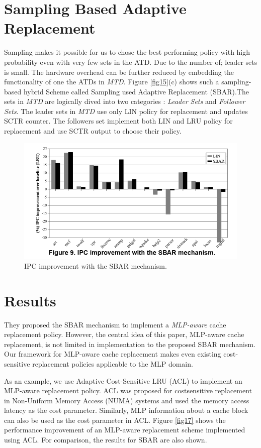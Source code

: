 \documentclass{report}
\begin{document}
\section{Sampling Based Adaptive Replacement}

Sampling makes it possible for us to chose the best performing policy with high probability even with very few sets in the ATD. Due to the number of; leader sets is small. The hardware overhead can be further reduced by embedding the functionality of one the ATDs in \emph{MTD}. Figure \ref{fig15}(c) shows such a sampling-based hybrid Scheme called Sampling used Adaptive Replacement (SBAR).The sets in \emph{MTD} are logically dived into two categories : \emph{Leader Sets} and \emph{Follower Sets}. The leader sets in \emph{MTD} use only LIN policy for replacement and updates SCTR counter. The followers set implement both LIN and LRU policy for replacement and use SCTR output to choose their policy.

\begin{figure}[h!]
\includegraphics[width=1\textwidth]{./fig16}
\caption{ IPC improvement with the SBAR mechanism.}
\label{fig16}
\end{figure}

\section{Results}
They proposed the SBAR mechanism to implement a \emph{MLP-aware} cache replacement policy. However, the central idea of this paper, MLP-aware cache replacement, is not limited in implementation to the proposed SBAR mechanism. Our framework for MLP-aware cache replacement makes even existing cost-sensitive replacement policies applicable to the MLP domain. 

As an example, we use Adaptive Cost-Sensitive LRU (ACL)  to implement an MLP-aware replacement policy. ACL was proposed for costsensitive replacement in Non-Uniform Memory Access (NUMA) systems and used the memory access latency as the cost parameter. Similarly, MLP information about a cache block can also be used as the cost parameter in ACL. Figure \ref{fig17} shows the performance improvement of an MLP-aware replacement scheme implemented using ACL. For comparison, the results for SBAR are also shown.
\end{document}

